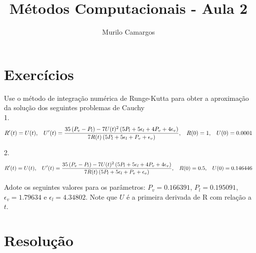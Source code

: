 \documentclass[10pt,a4paper]{article}
\author{Murilo Camargos}
\title{Métodos Computacionais - Aula 2}
\begin{document}


	\section{Exercícios}
	Use o método de integração numérica de Runge-Kutta para obter a aproximação da solução dos seguintes problemas de Cauchy\\
	
	1. \[R'(t)=U(t), \hspace{0.3cm} U'(t)=\frac{35\left(P_v-P_l\right) - 7U(t)^2\left(5P_l+5\epsilon_l+4P_v+4\epsilon_v\right)}{7R(t)\left(5P_l+5\epsilon_l+P_v+\epsilon_v\right)}, \hspace{0.3cm} R(0)=1, \hspace{0.3cm} U(0)=0.0001\]
	
	2. \[R'(t)=U(t), \hspace{0.3cm} U'(t)=\frac{35\left(P_v-P_l\right) - 7U(t)^2\left(5P_l+5\epsilon_l+4P_v+4\epsilon_v\right)}{7R(t)\left(5P_l+5\epsilon_l+P_v+\epsilon_v\right)}, \hspace{0.3cm} R(0)=0.5, \hspace{0.3cm} U(0)=0.146446\]
	
	Adote os seguintes valores para os parâmetros: $P_v=0.166391$, $P_l=0.195091$, $\epsilon_v=1.79634$ e $\epsilon_l=4.34802$. Note que $U$ é a primeira derivada de R com relação a $t$.
	
	\section{Resolução}
	
\end{document}

